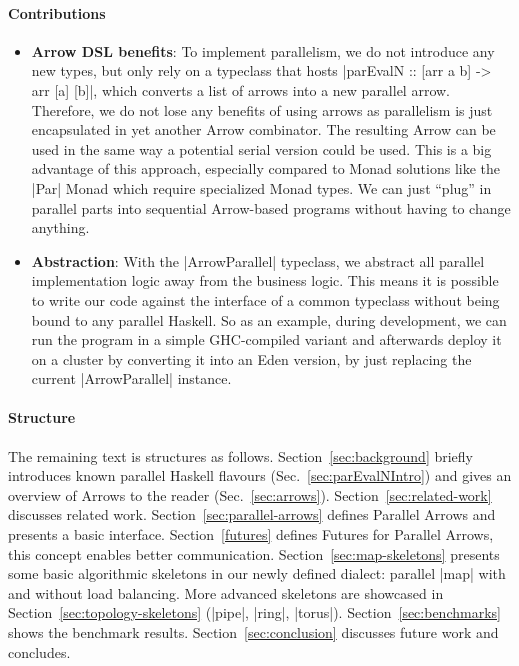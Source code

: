\paragraph{Contributions}
%
%
\begin{itemize}
	\item \textbf{Arrow DSL benefits}:
    To implement parallelism, we do not introduce any new types, but only rely on a typeclass that hosts |parEvalN :: [arr a b] -> arr [a] [b]|, which converts a list of arrows into a new parallel arrow. Therefore, we do not lose any benefits of using arrows as parallelism is just encapsulated in yet another Arrow combinator. The resulting Arrow can be used in the same way a potential serial version could be used. This is a big advantage of this approach, especially compared to Monad solutions like the |Par| Monad which require specialized Monad types. We can just \enquote{plug} in parallel parts into sequential Arrow-based programs without having to change anything.
	\item \textbf{Abstraction}:
	With the |ArrowParallel| typeclass, we abstract all parallel implementation logic away from the business logic. This means it is possible to write our code against the interface of a common typeclass without being bound to any parallel Haskell. So as an example, during development, we can run the program in a simple GHC-compiled variant and afterwards deploy it on a cluster by converting it into an Eden version, by just replacing the current |ArrowParallel| instance.
\end{itemize}


\paragraph{Structure}
The remaining text is structures as follows. Section~\ref{sec:background} briefly introduces known parallel Haskell flavours (Sec.~\ref{sec:parEvalNIntro}) and gives an overview of Arrows to the reader (Sec.~\ref{sec:arrows}). Section~\ref{sec:related-work} discusses related work. Section~\ref{sec:parallel-arrows} defines Parallel Arrows and presents a basic interface. Section~\ref{futures} defines Futures for Parallel Arrows, this concept enables better communication. Section~\ref{sec:map-skeletons} presents some basic algorithmic skeletons  in our newly defined dialect: parallel |map| with and without load balancing. More advanced skeletons are showcased in Section~\ref{sec:topology-skeletons} (|pipe|, |ring|, |torus|). Section~\ref{sec:benchmarks} shows the benchmark results. Section~\ref{sec:conclusion} discusses future work and concludes.

